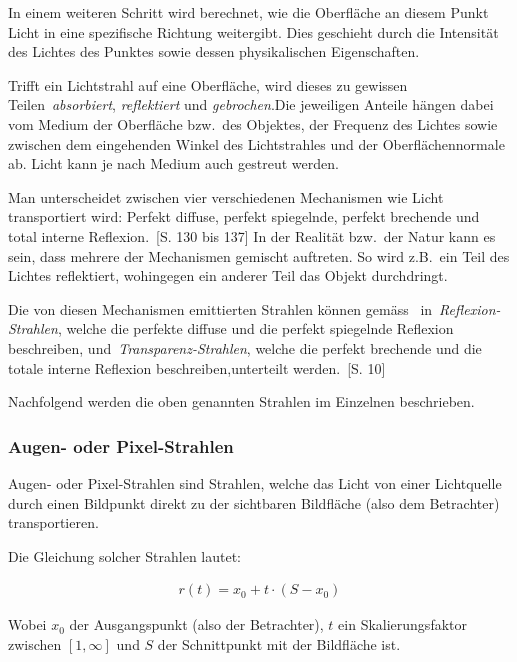 In einem weiteren Schritt wird berechnet, wie die Oberfläche an
diesem Punkt Licht in eine spezifische Richtung weitergibt. Dies
geschieht durch die Intensität des Lichtes des Punktes sowie dessen
physikalischen Eigenschaften.

Trifft ein Lichtstrahl auf eine Oberfläche, wird dieses zu gewissen
Teilen~\textit{absorbiert}, \textit{reflektiert} und
\textit{gebrochen}.Die jeweiligen Anteile hängen dabei vom Medium der
Oberfläche bzw.\ des Objektes, der Frequenz des Lichtes sowie zwischen
dem eingehenden Winkel des Lichtstrahles und der Oberflächennormale ab.
Licht kann je nach Medium auch gestreut werden.

Man unterscheidet zwischen vier verschiedenen Mechanismen wie Licht
transportiert wird: Perfekt diffuse, perfekt spiegelnde, perfekt
brechende und total interne
Reflexion.~\cite{glassner_introduction_1989}[S. 130 bis 137]
In der Realität bzw.\ der Natur kann es sein, dass mehrere der
Mechanismen gemischt auftreten. So wird z.B.\ ein Teil des Lichtes
reflektiert, wohingegen ein anderer Teil das Objekt durchdringt.

Die von diesen Mechanismen emittierten Strahlen können
gemäss~\citeauthor{glassner_introduction_1989}
in~\textit{Reflexion-Strahlen}, welche die perfekte diffuse und die
perfekt spiegelnde Reflexion beschreiben,
und~\textit{Transparenz-Strahlen}, welche die perfekt brechende und die
totale interne Reflexion beschreiben,unterteilt
werden.~\cite{glassner_introduction_1989}[S. 10]


Nachfolgend werden die oben genannten Strahlen im Einzelnen beschrieben.

\subsubsection{Augen- oder Pixel-Strahlen}
\label{ssubsec:ray_tracing:eye_rays}

Augen- oder Pixel-Strahlen sind Strahlen, welche das Licht von einer
Lichtquelle durch einen Bildpunkt direkt zu der sichtbaren Bildfläche
(also dem Betrachter) transportieren.

Die Gleichung solcher Strahlen lautet:

\begin{gather}
    r(t) = x_{0} + t \cdot (S - x_{0})
\end{gather}

Wobei $x_{0}$ der Ausgangspunkt (also der Betrachter), $t$ ein
Skalierungsfaktor zwischen $[1, \infty]$ und $S$ der Schnittpunkt mit der
Bildfläche ist.

